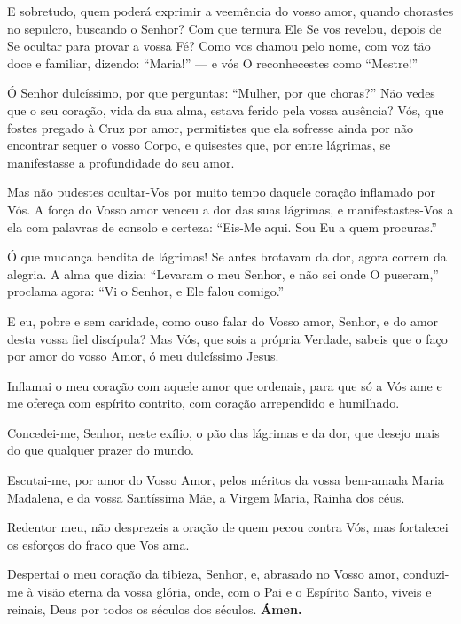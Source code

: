 \documentclass[a4paper,12pt]{extarticle}
\begin{document}
E sobretudo, quem poderá exprimir a veemência do vosso amor, quando chorastes no sepulcro, buscando o Senhor? Com que ternura Ele Se vos revelou, depois de Se ocultar para provar a vossa Fé? Como vos chamou pelo nome, com voz tão doce e familiar, dizendo: “Maria!” — e vós O reconhecestes como “Mestre!”

Ó Senhor dulcíssimo, por que perguntas: “Mulher, por que choras?” Não vedes que o seu coração, vida da sua alma, estava ferido pela vossa ausência? Vós, que fostes pregado à Cruz por amor, permitistes que ela sofresse ainda por não encontrar sequer o vosso Corpo, e quisestes que, por entre lágrimas, se manifestasse a profundidade do seu amor.

Mas não pudestes ocultar-Vos por muito tempo daquele coração inflamado por Vós. A força do Vosso amor venceu a dor das suas lágrimas, e manifestastes-Vos a ela com palavras de consolo e certeza: “Eis-Me aqui. Sou Eu a quem procuras.”

Ó que mudança bendita de lágrimas! Se antes brotavam da dor, agora correm da alegria. A alma que dizia: “Levaram o meu Senhor, e não sei onde O puseram,” proclama agora: “Vi o Senhor, e Ele falou comigo.”

E eu, pobre e sem caridade, como ouso falar do Vosso amor, Senhor, e do amor desta vossa fiel discípula? Mas Vós, que sois a própria Verdade, sabeis que o faço por amor do vosso Amor, ó meu dulcíssimo Jesus.

Inflamai o meu coração com aquele amor que ordenais, para que só a Vós ame e me ofereça com espírito contrito, com coração arrependido e humilhado.

Concedei-me, Senhor, neste exílio, o pão das lágrimas e da dor, que desejo mais do que qualquer prazer do mundo.

Escutai-me, por amor do Vosso Amor, pelos méritos da vossa bem-amada Maria Madalena, e da vossa Santíssima Mãe, a Virgem Maria, Rainha dos céus.

Redentor meu, não desprezeis a oração de quem pecou contra Vós, mas fortalecei os esforços do fraco que Vos ama.

Despertai o meu coração da tibieza, Senhor, e, abrasado no Vosso amor, conduzi-me à visão eterna da vossa glória, onde, com o Pai e o Espírito Santo, viveis e reinais, Deus por todos os séculos dos séculos. \textbf{Ámen.}
\end{document}
